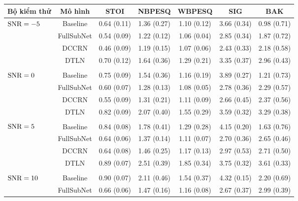 		\begin{table}[h]
			\centering
			\begin{tabular}{l c c c c c c}
				\hline
				\multicolumn{1}{c}{\textbf{Bộ kiểm thử}}	& \textbf{Mô hình}	& \textbf{STOI}	& \textbf{NBPESQ}	& \textbf{WBPESQ}	& \textbf{SIG}	& \textbf{BAK} \\
				\hline
				\multirow{4}{*}{$\text{SNR}=-5$}        &Baseline       & 0.64 (0.11)   & 1.36 (0.27)   & 1.10 (0.12)   & 3.66 (0.34)   & 0.98 (0.71) \\
				&FullSubNet     & 0.54 (0.09)   & 1.22 (0.12)   & 1.06 (0.04)   & 2.85 (0.34)   & 1.87 (0.72) \\
				&DCCRN  & 0.46 (0.09)   & 1.19 (0.15)   & 1.07 (0.06)   & 2.43 (0.33)   & 2.18 (0.58) \\
				&DTLN   & 0.70 (0.12)   & 1.64 (0.36)   & 1.29 (0.21)   & 3.35 (0.37)   & 2.96 (0.43) \\
				&&&&&&\\
				\multirow{4}{*}{$\text{SNR}=0$}         &Baseline       & 0.75 (0.09)   & 1.54 (0.36)   & 1.16 (0.19)   & 3.89 (0.27)   & 1.21 (0.73) \\
				&FullSubNet     & 0.60 (0.07)   & 1.28 (0.13)   & 1.08 (0.05)   & 2.78 (0.36)   & 2.29 (0.57) \\
				&DCCRN  & 0.55 (0.09)   & 1.31 (0.21)   & 1.11 (0.09)   & 2.66 (0.45)   & 2.37 (0.56) \\
				&DTLN   & 0.82 (0.09)   & 2.07 (0.40)   & 1.55 (0.29)   & 3.59 (0.32)   & 3.29 (0.38) \\
				&&&&&&\\
				\multirow{4}{*}{$\text{SNR}=5$}         &Baseline       & 0.84 (0.08)   & 1.78 (0.41)   & 1.29 (0.28)   & 4.15 (0.20)   & 1.63 (0.76) \\
				&FullSubNet     & 0.64 (0.06)   & 1.37 (0.14)   & 1.11 (0.07)   & 2.70 (0.36)   & 2.65 (0.46) \\
				&DCCRN  & 0.64 (0.08)   & 1.46 (0.25)   & 1.17 (0.13)   & 2.97 (0.53)   & 2.71 (0.50) \\
				&DTLN   & 0.89 (0.07)   & 2.51 (0.39)   & 1.85 (0.34)   & 3.75 (0.32)   & 3.61 (0.33) \\
				&&&&&&\\
				\multirow{4}{*}{$\text{SNR}=10$}        &Baseline       & 0.90 (0.07)   & 2.11 (0.46)   & 1.54 (0.37)   & 4.32 (0.15)   & 2.20 (0.69) \\
				&FullSubNet     & 0.66 (0.06)   & 1.47 (0.16)   & 1.16 (0.08)   & 2.67 (0.37)   & 2.99 (0.39) \\

\end{tabular}
\end{table}
